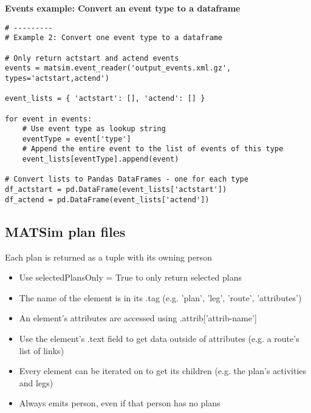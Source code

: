 \noindent\textbf{Events example: Convert an event type to a dataframe}

\begin{lstlisting}
# ---------
# Example 2: Convert one event type to a dataframe

# Only return actstart and actend events
events = matsim.event_reader('output_events.xml.gz', types='actstart,actend')

event_lists = { 'actstart': [], 'actend': [] }

for event in events:
    # Use event type as lookup string
    eventType = event['type']
    # Append the entire event to the list of events of this type
    event_lists[eventType].append(event)

# Convert lists to Pandas DataFrames - one for each type
df_actstart = pd.DataFrame(event_lists['actstart'])
df_actend = pd.DataFrame(event_lists['actend'])
\end{lstlisting}


\subsection{MATSim plan files}

Each plan is returned as a tuple with its owning person

\begin{itemize}
  \tightlist
    \item
        Use selectedPlansOnly = True to only return selected plans
    \item
        The name of the element is in its .tag (e.g. 'plan', 'leg', 'route', 'attributes')
    \item
        An element's attributes are accessed using .attrib['attrib-name']
    \item
        Use the element's .text field to get data outside of attributes (e.g. a route's list of links)
    \item
        Every element can be iterated on to get its children (e.g. the plan's activities and legs)
    \item
        Always emits person, even if that person has no plans

  \end{itemize}

